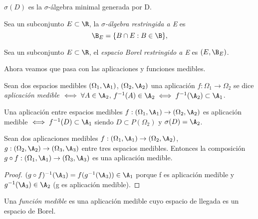 \begin{nota}
  $\sigma(D)$ es la $\sigma$-álgebra minimal generada por D.
\end{nota}

\begin{ndef}
  Sea un subconjunto $E \subset \R$, la \emph{$\sigma$-álgebra restringida a E} es $$\B_E = \{ B \cap E : B \in \B \},$$
\end{ndef}

\begin{ndef}
  Sea un subconjunto $E \subset \R$, el \emph{espacio Borel restringido a E} es $(E, \B_E)$.
\end{ndef}

Ahora veamos que pasa con las aplicaciones y funciones medibles.

\begin{ndef}
  Sean dos espacios medibles $(\Omega_1, \A_1)$, $(\Omega_2, \A_2)$ una aplicación $f : \Omega_1 \to \Omega_2$ se dice \emph{aplicación medible} $\iff \forall A \in \A_2$, $f^{-1}(A)\in \A_2 \iff f^{-1}(\A_2) \subset \A_1$.
\end{ndef}

\begin{nprop}
  Una aplicación entre espacios medibles $f : (\Omega_1, \A_1) \to (\Omega_2, \A_2)$ es aplicación medible $\iff f^{-1}(D) \subset \A_1$ siendo $D \subset P(\Omega_2)$ y $\sigma(D) = \A_2$.
\end{nprop}

\begin{nprop}
  Sean dos aplicaciones medibles $f : (\Omega_1, \A_1) \to (\Omega_2, \A_2)$, $g : (\Omega_2, \A_2) \to (\Omega_3, \A_3)$ entre tres espacios medibles. Entonces la composición $g \circ f : (\Omega_1, \A_1) \to (\Omega_3, \A_3)$ es una aplicación medible.
\end{nprop}

\begin{proof}
  $(g \circ f)^{-1}(\A_3) = f(g^{-1}(\A_3)) \in \A_1$ porque f es aplicación medible y $g^{-1}(\A_3) \in \A_2$ (g es aplicación medible).
\end{proof}


\begin{ndef}
  Una \emph{función medible} es una aplicación medible cuyo espacio de llegada es un espacio de Borel.
\end{ndef}

